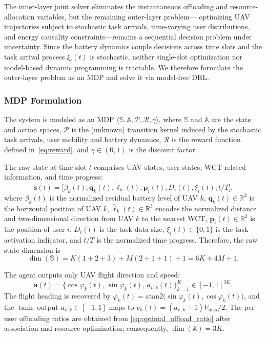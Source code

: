 \documentclass[journal]{IEEEtran}
\begin{document}
The inner-layer joint solver eliminates the instantaneous offloading and
resource-allocation variables, but the remaining outer-layer problem---
optimizing UAV trajectories subject to stochastic task arrivals,
time-varying user distributions, and energy causality constraints---remains
a sequential decision problem under uncertainty.
Since the battery dynamics couple decisions across
time slots and the task arrival process $\xi_i(t)$ is stochastic,
neither single-slot optimization nor model-based dynamic programming
is tractable.
We therefore formulate the outer-layer problem as an MDP
and solve it via model-free DRL.

\subsubsection{MDP Formulation}

The system is modeled as an MDP
\(\langle \mathbb{S},\mathbb{A},\mathcal{P},\mathcal{R},\gamma\rangle\),
where $\mathbb{S}$ and $\mathbb{A}$ are the state and action spaces,
$\mathcal{P}$ is the (unknown) transition kernel induced by the stochastic task
arrivals, user mobility and battery dynamics, $\mathcal{R}$ is the reward
function defined in~\eqref{eq:reward}, and $\gamma\in(0,1)$ is the discount
factor.

The raw state at time slot \(t\) comprises UAV states, user states,
WCT-related information, and time progress:
\begin{equation}\label{eq:state}
\bm{s}(t) = \bigl[
    \beta_k(t), \bm{q}_k(t), \tilde{\bm{\ell}}_k(t),
\bm{p}_i(t), D_i(t), \xi_i(t), t/T
\bigr].
\end{equation}
where \(\beta_k(t)\) is the normalized residual battery level of UAV \(k\),
\(\bm{q}_k(t)\in\mathbb{R}^{2}\) is the horizontal position of UAV \(k\),
\(\tilde{\bm{\ell}}_k(t)\in\mathbb{R}^{3}\) encodes the normalized
distance and two-dimensional direction from UAV \(k\) to the nearest WCT,
\(\bm{p}_i(t)\in\mathbb{R}^{2}\) is the position of user \(i\),
\(D_i(t)\) is the task data size, \(\xi_i(t)\in\{0,1\}\) is the task activation
indicator, and \(t/T\) is the normalized time progress. Therefore, the raw
state dimension is
\[
\dim(\mathbb{S}) = K(1+2+3)+M(2+1+1)+1 = 6K+4M+1.
\]



The agent outputs only UAV flight direction and speed:
\begin{equation}\label{eq:action}
  \bm{a}(t)=
  \bigl\{\cos\varphi_k(t),\,\sin\varphi_k(t),\,a_{v,k}(t)\bigr\}_{k=1}^{K}
  \in[-1,1]^{3K}.
\end{equation}
The flight heading is recovered by
$\varphi_k(t)=\mathrm{atan2}\bigl(\sin\varphi_k(t),\cos\varphi_k(t)\bigr)$,
and the $\tanh$ output $a_{v,k}\in[-1,1]$ maps to
$v_k(t)=(a_{v,k}+1)V_{\max}/2$. The per-user offloading ratios are obtained
from \eqref{eq:optimal_offload_ratio} after association and resource
optimization; consequently, $\dim(\mathbb{A})=3K$.
\end{document}
